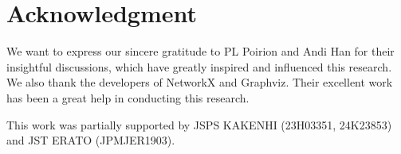 \documentclass[11pt]{article}
\begin{document}
\section{Acknowledgment}

We want to express our sincere gratitude to PL Poirion and Andi Han
for their insightful discussions, which have greatly inspired and influenced this research. We also thank the developers of NetworkX and Graphviz. Their excellent work has been a great help in conducting this research.

This work was partially supported by JSPS KAKENHI (23H03351, 24K23853) and JST ERATO (JPMJER1903).



\end{document}
